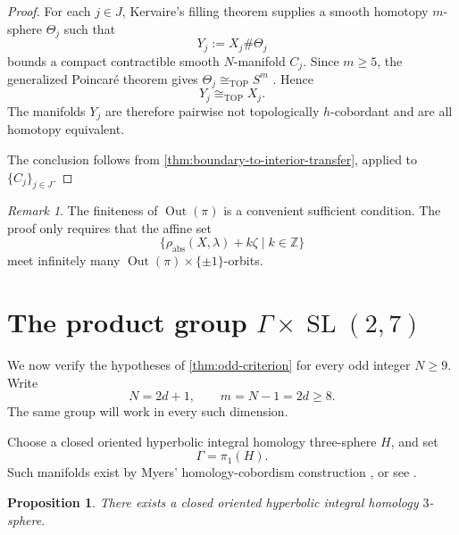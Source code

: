 \documentclass[10pt,reqno]{amsart}
\numberwithin{equation}{section}
\newtheorem{proposition}{Proposition}
\theoremstyle{definition}
\theoremstyle{remark}
\newtheorem{remark}{Remark}
\newcommand{\Z}{\mathbb Z}
\newcommand{\TOP}{\mathrm{TOP}}
\newcommand{\Out}{\operatorname{Out}}
\newcommand{\SL}{\operatorname{SL}}
\newcommand{\rhoabs}{\rho_{\mathrm{abs}}}
\begin{document}
\begin{proof}
For each \(j\in J\), Kervaire's filling theorem
\cite[Theorem~3]{KervaireHomologySpheres} supplies a smooth homotopy
\(m\)-sphere \(\Theta_j\) such that
\[
Y_j:=X_j\#\Theta_j
\]
bounds a compact contractible smooth \(N\)-manifold \(C_j\).  Since
\(m\geq5\), the generalized Poincar\'e theorem gives
\(\Theta_j\cong_{\TOP}S^m\) \cite{SmalePoincare}.  Hence
\[
Y_j\cong_{\TOP}X_j.
\]
The manifolds \(Y_j\) are therefore pairwise not topologically
\(h\)-cobordant and are all homotopy equivalent.

The conclusion follows from
\cref{thm:boundary-to-interior-transfer}, applied to
\(\{C_j\}_{j\in J}\).
\end{proof}

\begin{remark}\label{rem:odd-criterion-orbits}
The finiteness of \(\Out(\pi)\) is a convenient sufficient condition.
The proof only requires that the affine set
\[
\{\rhoabs(X,\lambda)+k\zeta\mid k\in\Z\}
\]
meet infinitely many \(\Out(\pi)\times\{\pm1\}\)-orbits.
\end{remark}
\section{The product group \texorpdfstring{\(\Gamma\times\SL(2,7)\)}{Gamma x SL(2,7)}}
\label{sec:odd-product-group}

We now verify the hypotheses of \cref{thm:odd-criterion} for every
odd integer \(N\geq9\).  Write
\[
N=2d+1,
\qquad
m=N-1=2d\geq8.
\]
The same group will work in every such dimension.

Choose a closed oriented hyperbolic integral homology three-sphere
\(H\), and set
\[
\Gamma=\pi_1(H).
\]
Such manifolds exist by Myers' homology-cobordism construction
\cite{MyersHyperbolic}, or see . 


\begin{proposition}\label{prop:existence_of_hyperbolic_3_sphere}
There exists a closed oriented hyperbolic integral homology
$3$-sphere.
\end{proposition}
\end{document}
